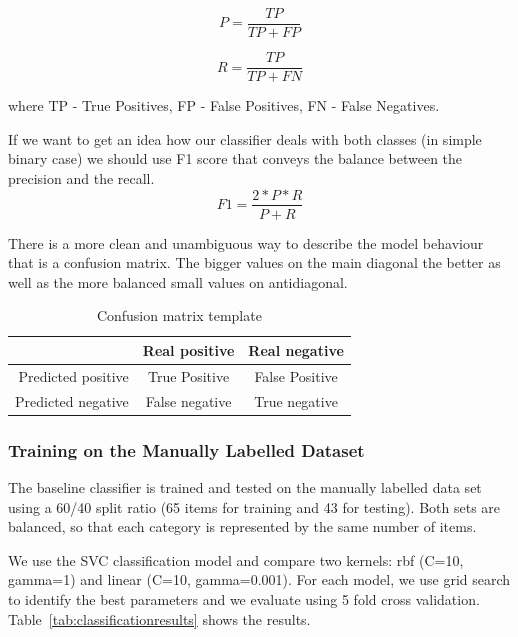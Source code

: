 \documentclass[11pt]{article}
\begin{document}
\begin{equation}
P = \frac{TP}{TP+FP} 
\end{equation}

\begin{equation}
R = \frac{TP}{TP+FN}
\end{equation}

where TP - True Positives, FP - False Positives, FN - False Negatives.

If we want to get an idea how our classifier deals with both classes (in simple binary case) we should use F1 score that conveys the balance between the precision and the recall.
\begin{equation}
F1 = \frac{2*P*R}{P+R}
\end{equation}

    There is a more clean and unambiguous way to describe the model behaviour that is a confusion matrix. The bigger values on the main diagonal the better as well as the more balanced small values on antidiagonal.

\begin{table}[htb]
\begin{center}
\begin{tabular}{ |r|c|c| }
\hline
& Real positive & Real negative \\ \hline
Predicted positive & True Positive 	& False Positive \\ \hline
Predicted negative & False negative & True negative \\ \hline
\end{tabular}
\caption{Confusion matrix template}
\end{center}
\end{table}
\FloatBarrier

\subsubsection{Training on the Manually Labelled Dataset}

The baseline classifier is trained and tested on the manually labelled
data set using a 60/40 split ratio (65 items for training and 43 for
testing). Both sets are balanced, so that each category is represented
by the same number of items.

We use the SVC classification model and compare two kernels: rbf
(C=10, gamma=1) and linear (C=10, gamma=0.001). For each model, we use
grid search to identify the best parameters and we evaluate using 5
fold cross validation. Table~\ref{tab:classificationresults} shows the results. 
\end{document}
